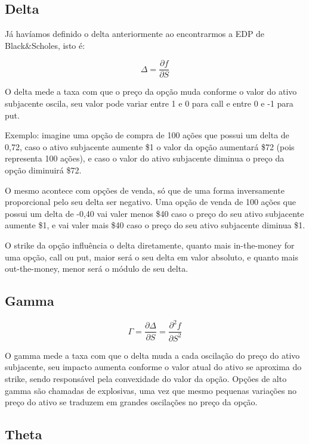 \documentclass[]{book}
\begin{document}
\subsection{Delta}\label{delta}

Já havíamos definido o delta anteriormente ao encontrarmos a EDP de
Black\&Scholes, isto é:

\begin{equation}
\Delta = \frac{\partial f}{\partial S}
\label{eq:delta}
\end{equation}

O delta mede a taxa com que o preço da opção muda conforme o valor do
ativo subjacente oscila, seu valor pode variar entre 1 e 0 para call e
entre 0 e -1 para put.

Exemplo: imagine uma opção de compra de 100 ações que possui um delta de
0,72, caso o ativo subjacente aumente {\$}1 o valor da opção aumentará
{\$}72 (pois representa 100 ações), e caso o valor do ativo subjacente
diminua o preço da opção diminuirá {\$}72.

O mesmo acontece com opções de venda, só que de uma forma inversamente
proporcional pelo seu delta ser negativo. Uma opção de venda de 100
ações que possui um delta de -0,40 vai valer menos {\$}40 caso o preço
do seu ativo subjacente aumente {\$}1, e vai valer mais {\$}40 caso o
preço do seu ativo subjacente diminua {\$}1.

O strike da opção influência o delta diretamente, quanto mais
in-the-money for uma opção, call ou put, maior será o seu delta em valor
absoluto, e quanto mais out-the-money, menor será o módulo de seu delta.

\subsection{Gamma}\label{gamma}

\begin{equation}
\Gamma = \frac{\partial \Delta}{\partial S} = \frac{\partial^2 f}{\partial S^2}
\label{eq:gamma}
\end{equation}

O gamma mede a taxa com que o delta muda a cada oscilação do preço do
ativo subjacente, seu impacto aumenta conforme o valor atual do ativo se
aproxima do strike, sendo responsável pela convexidade do valor da
opção. Opções de alto gamma são chamadas de explosivas, uma vez que
mesmo pequenas variações no preço do ativo se traduzem em grandes
oscilações no preço da opção.

\subsection{Theta}\label{theta}
\end{document}
